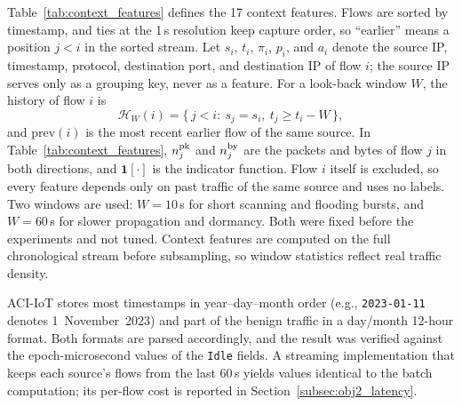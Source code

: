 \documentclass[conference]{IEEEtran}
\begin{document}
Table~\ref{tab:context_features} defines
the 17 context features. Flows are sorted by timestamp, and ties at
the 1\,s resolution keep capture order, so ``earlier'' means a
position $j<i$ in the sorted stream. Let $s_i$, $t_i$, $\pi_i$,
$p_i$, and $a_i$ denote the source IP, timestamp, protocol,
destination port, and destination IP of flow $i$; the source IP
serves only as a grouping key, never as a feature. For a look-back
window $W$, the history of flow $i$ is
\begin{equation}
\mathcal{H}_W(i)=\{\,j<i:\ s_j=s_i,\ t_j\ge t_i-W\,\},
\label{eq:context_history}
\end{equation}
and $\mathrm{prev}(i)$ is the most recent
earlier flow of the same source. In Table~\ref{tab:context_features},
$n^{\rm pk}_j$ and $n^{\rm by}_j$ are the packets and bytes of flow
$j$ in both directions, and $\mathbf{1}[\cdot]$ is the indicator
function. Flow $i$ itself is excluded, so
every feature depends only on past traffic of the same source and
uses no labels. Two windows are used: $W=10$\,s for short scanning
and flooding bursts, and $W=60$\,s for slower propagation and
dormancy. Both were fixed before the experiments and not tuned.
Context features are computed on the full chronological stream
before subsampling, so window statistics reflect real traffic
density.

ACI-IoT stores most timestamps in
year--day--month order (e.g., \texttt{2023-01-11} denotes
1~November~2023) and part of the benign traffic in a day/month
12-hour format. Both formats are parsed accordingly, and the result
was verified against the epoch-microsecond values of the
\texttt{Idle} fields. A streaming implementation that keeps each
source's flows from the last 60\,s yields values identical to the
batch computation; its per-flow cost is reported in
Section~\ref{subsec:obj2_latency}.
\end{document}
